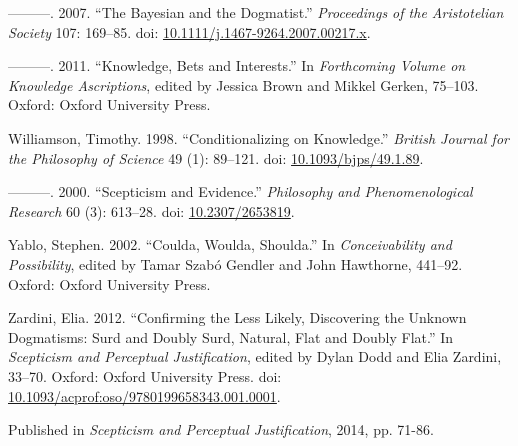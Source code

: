 \documentclass[
  10pt,
  letterpaper,
  DIV=11,
  numbers=noendperiod,
  twoside]{scrartcl}
\newlength{\cslhangindent}
\newenvironment{CSLReferences}[2] %
 {\begin{list}{}{%
  \setlength{\itemindent}{0pt}
  \setlength{\leftmargin}{0pt}
  \setlength{\parsep}{0pt}
  \ifodd #1
   \setlength{\leftmargin}{\cslhangindent}
   \setlength{\itemindent}{-1\cslhangindent}
  \fi
  \setlength{\itemsep}{#2\baselineskip}}}
 {\end{list}}
\begin{document}
\begin{CSLReferences}{1}{0}
---------. 2007. {``The Bayesian and the Dogmatist.''} \emph{Proceedings
of the Aristotelian Society} 107: 169--85. doi:
\href{https://doi.org/10.1111/j.1467-9264.2007.00217.x}{10.1111/j.1467-9264.2007.00217.x}.

---------. 2011. {``Knowledge, Bets and Interests.''} In
\emph{Forthcoming Volume on Knowledge Ascriptions}, edited by Jessica
Brown and Mikkel Gerken, 75--103. Oxford: Oxford University Press.

Williamson, Timothy. 1998. {``{Conditionalizing on Knowledge}.''}
\emph{British Journal for the Philosophy of Science} 49 (1): 89--121.
doi: \href{https://doi.org/10.1093/bjps/49.1.89}{10.1093/bjps/49.1.89}.

---------. 2000. {``{Scepticism and Evidence}.''} \emph{Philosophy and
Phenomenological Research} 60 (3): 613--28. doi:
\href{https://doi.org/10.2307/2653819}{10.2307/2653819}.

Yablo, Stephen. 2002. {``Coulda, Woulda, Shoulda.''} In
\emph{Conceivability and Possibility}, edited by Tamar Szabó Gendler and
John Hawthorne, 441--92. Oxford: Oxford University Press.

Zardini, Elia. 2012. {``Confirming the Less Likely, Discovering the
Unknown Dogmatisms: Surd and Doubly Surd, Natural, Flat and Doubly
Flat.''} In \emph{Scepticism and Perceptual Justification}, edited by
Dylan Dodd and Elia Zardini, 33--70. Oxford: Oxford University Press.
doi:
\href{https://doi.org/10.1093/acprof:oso/9780199658343.001.0001}{10.1093/acprof:oso/9780199658343.001.0001}.

\end{CSLReferences}



\noindent Published in\emph{
Scepticism and Perceptual Justification}, 2014, pp. 71-86.
\end{document}
